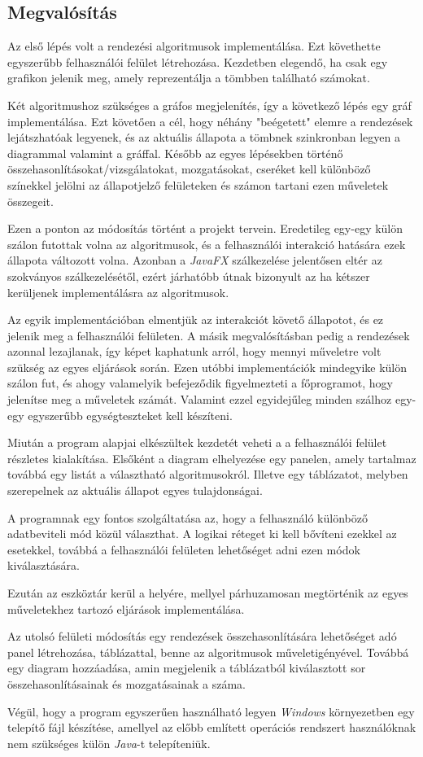 \documentclass{elteikthesis}
\begin{document}
\subsection{Megvalósítás}
Az első lépés volt a rendezési algoritmusok implementálása.
Ezt követhette egyszerűbb felhasználói felület létrehozása. Kezdetben elegendő, ha csak egy grafikon jelenik meg, amely reprezentálja a tömbben található számokat.\par
Két algoritmushoz szükséges a gráfos megjelenítés, így a következő lépés egy gráf implementálása.
Ezt követően a cél, hogy néhány "beégetett" elemre a rendezések lejátszhatóak legyenek, és az aktuális állapota a tömbnek szinkronban legyen a diagrammal valamint a gráffal. Később az egyes lépésekben történő összehasonlításokat/vizsgálatokat, mozgatásokat, cseréket kell különböző színekkel jelölni az állapotjelző felületeken és számon tartani ezen műveletek összegeit.\par
Ezen a ponton az módosítás történt a projekt tervein. Eredetileg egy-egy külön szálon futottak volna az algoritmusok, és a felhasználói interakció hatására ezek állapota változott volna. Azonban a \emph{JavaFX} szálkezelése jelentősen eltér az szokványos szálkezelésétől, ezért járhatóbb útnak bizonyult az ha kétszer kerüljenek implementálásra az algoritmusok.\par Az egyik implementációban elmentjük az interakciót követő állapotot, és ez jelenik meg a felhasználói felületen. A másik megvalósításban pedig a rendezések azonnal lezajlanak, így képet kaphatunk arról, hogy mennyi műveletre volt szükség az egyes eljárások során. Ezen utóbbi implementációk mindegyike külön szálon fut, és ahogy valamelyik befejeződik figyelmezteti a főprogramot, hogy jelenítse meg a műveletek számát. Valamint ezzel egyidejűleg minden szálhoz egy-egy egyszerűbb egységteszteket kell készíteni.\par
Miután a program alapjai elkészültek kezdetét veheti a a felhasználói felület részletes kialakítása. Elsőként a diagram elhelyezése egy panelen, amely tartalmaz továbbá egy listát a választható algoritmusokról. Illetve egy táblázatot, melyben szerepelnek az aktuális állapot egyes tulajdonságai.\par
A programnak egy fontos szolgáltatása az, hogy a felhasználó különböző adatbeviteli mód közül választhat. A logikai réteget ki kell bővíteni ezekkel az esetekkel, továbbá a felhasználói felületen lehetőséget adni ezen módok kiválasztására.\par
Ezután az eszköztár kerül a helyére, mellyel párhuzamosan megtörténik az egyes műveletekhez tartozó eljárások implementálása.\par
Az utolsó felületi módosítás egy rendezések összehasonlítására lehetőséget adó panel létrehozása, táblázattal, benne az algoritmusok műveletigényével. Továbbá egy diagram hozzáadása, amin megjelenik a táblázatból kiválasztott sor összehasonlításainak és mozgatásainak a száma.\par
Végül, hogy a program egyszerűen használható legyen \emph{Windows} környezetben egy telepítő fájl készítése, amellyel az előbb említett operációs rendszert használóknak nem szükséges külön \emph{Java}-t telepíteniük.
\end{document}
